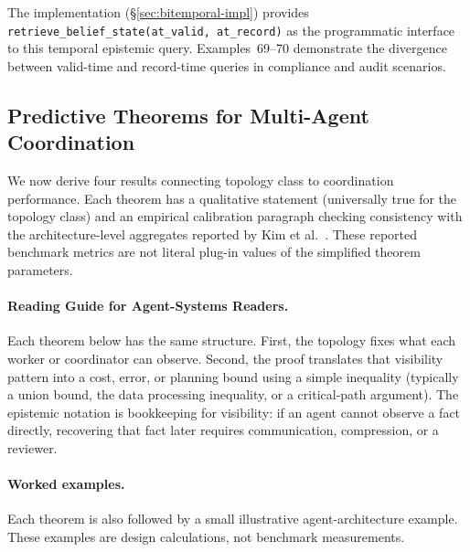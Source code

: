The implementation (\S\ref{sec:bitemporal-impl}) provides \texttt{retrieve\_belief\_state(at\_valid, at\_record)} as the programmatic interface to this temporal epistemic query. Examples~69--70 demonstrate the divergence between valid-time and record-time queries in compliance and audit scenarios.

\subsection{Predictive Theorems for Multi-Agent Coordination}

We now derive four results connecting topology class to coordination performance. Each theorem has a qualitative statement (universally true for the topology class) and an empirical calibration paragraph checking consistency with the architecture-level aggregates reported by Kim et al.~\cite{kim2025scaling}. These reported benchmark metrics are not literal plug-in values of the simplified theorem parameters.

\paragraph{Reading Guide for Agent-Systems Readers.}
Each theorem below has the same structure. First, the topology fixes what each worker or coordinator can observe. Second, the proof translates that visibility pattern into a cost, error, or planning bound using a simple inequality (typically a union bound, the data processing inequality, or a critical-path argument). The epistemic notation is bookkeeping for visibility: if an agent cannot observe a fact directly, recovering that fact later requires communication, compression, or a reviewer.

\paragraph{Worked examples.}
Each theorem is also followed by a small illustrative agent-architecture example. These examples are design calculations, not benchmark measurements.

